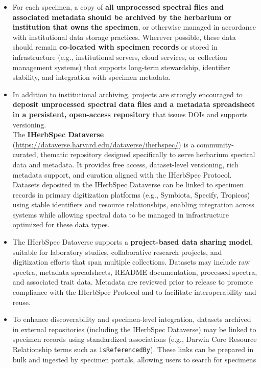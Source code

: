 \documentclass[
  letterpaper,
  DIV=11,
  numbers=noendperiod]{scrreprt}
\begin{document}
\begin{itemize}
\item
  For each specimen, a copy of \textbf{all unprocessed spectral files
  and associated metadata should be archived by the herbarium or
  institution that owns the specimen}, or otherwise managed in
  accordance with institutional data storage practices. Wherever
  possible, these data should remain \textbf{co-located with specimen
  records} or stored in infrastructure (e.g., institutional servers,
  cloud services, or collection management systems) that supports
  long-term stewardship, identifier stability, and integration with
  specimen metadata.
\item
  In addition to institutional archiving, projects are strongly
  encouraged to \textbf{deposit unprocessed spectral data files and a
  metadata spreadsheet in a persistent, open-access repository} that
  issues DOIs and supports versioning.\\
  The \textbf{IHerbSpec Dataverse}
  (\url{https://dataverse.harvard.edu/dataverse/iherbspec/}) is a
  community-curated, thematic repository designed specifically to serve
  herbarium spectral data and metadata. It provides free access,
  dataset-level versioning, rich metadata support, and curation aligned
  with the IHerbSpec Protocol. Datasets deposited in the IHerbSpec
  Dataverse can be linked to specimen records in primary digitization
  platforms (e.g., Symbiota, Specify, Tropicos) using stable identifiers
  and resource relationships, enabling integration across systems while
  allowing spectral data to be managed in infrastructure optimized for
  these data types.
\item
  The IHerbSpec Dataverse supports a \textbf{project-based data sharing
  model}, suitable for laboratory studies, collaborative research
  projects, and digitization efforts that span multiple collections.
  Datasets may include raw spectra, metadata spreadsheets, README
  documentation, processed spectra, and associated trait data. Metadata
  are reviewed prior to release to promote compliance with the IHerbSpec
  Protocol and to facilitate interoperability and reuse.
\item
  To enhance discoverability and specimen-level integration, datasets
  archived in external repositories (including the IHerbSpec Dataverse)
  may be linked to specimen records using standardized associations
  (e.g., Darwin Core Resource Relationship terms such as
  \texttt{isReferencedBy}). These links can be prepared in bulk and
  ingested by specimen portals, allowing users to search for specimens

\end{itemize}
\end{document}
